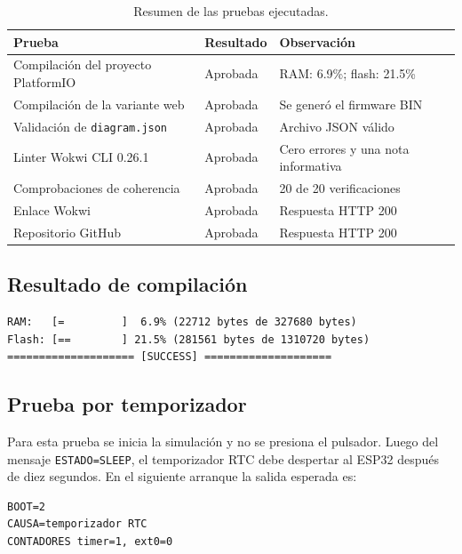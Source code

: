 \documentclass{article}
\newcommand{\tableheader}[1]{\color{tablewhite}\textbf{#1}}
\begin{document}
\begin{table}[H]
\centering
\renewcommand{\arraystretch}{1.25}
\begin{tabularx}{\linewidth}{|Y|p{3.2cm}|p{5.3cm}|}
\hline
{}\tableheader{Prueba} & \tableheader{Resultado} & \tableheader{Observación} \\
\hline
Compilación del proyecto PlatformIO & Aprobada & RAM: 6.9\%; flash: 21.5\% \\
\hline
Compilación de la variante web & Aprobada & Se generó el firmware BIN \\
\hline
Validación de \texttt{diagram.json} & Aprobada & Archivo JSON válido \\
\hline
Linter Wokwi CLI 0.26.1 & Aprobada & Cero errores y una nota informativa \\
\hline
Comprobaciones de coherencia & Aprobada & 20 de 20 verificaciones \\
\hline
Enlace Wokwi & Aprobada & Respuesta HTTP 200 \\
\hline
Repositorio GitHub & Aprobada & Respuesta HTTP 200 \\
\hline
\end{tabularx}
\caption{Resumen de las pruebas ejecutadas.}
\end{table}

\subsection{Resultado de compilación}

\begin{lstlisting}[language={}]
RAM:   [=         ]  6.9% (22712 bytes de 327680 bytes)
Flash: [==        ] 21.5% (281561 bytes de 1310720 bytes)
==================== [SUCCESS] ====================
\end{lstlisting}

\subsection{Prueba por temporizador}

Para esta prueba se inicia la simulación y no se presiona el pulsador. Luego del mensaje \texttt{ESTADO=SLEEP}, el temporizador RTC debe despertar al ESP32 después de diez segundos. En el siguiente arranque la salida esperada es:

\begin{lstlisting}[language={}]
BOOT=2
CAUSA=temporizador RTC
CONTADORES timer=1, ext0=0
\end{lstlisting}
\end{document}
